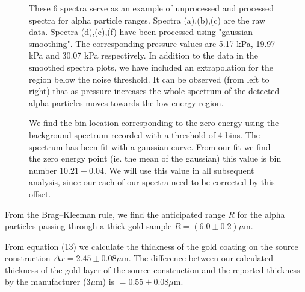 \documentclass[a4paper]{article}
\begin{document}
\begin{figure}[!htbp]
{{}}
\caption{These 6 spectra serve as an example of unprocessed and processed spectra for alpha particle ranges. Spectra (a),(b),(c) are the raw data. Spectra (d),(e),(f) have been processed using "gaussian smoothing". The corresponding pressure values are 5.17 kPa, 19.97 kPa and 30.07 kPa respectively. In addition to the data in the smoothed spectra plots, we have included an extrapolation for the region below the noise threshold. It can be observed (from left to right) that as pressure increases the whole spectrum of the detected alpha particles moves towards the low energy region.
}
\end{figure}
\clearpage
\begin{figure}
\caption{
 We find the bin location corresponding to the zero energy using the background spectrum recorded with a threshold of 4 bins. The spectrum has been fit with a gaussian curve. From our fit we find the zero energy point (ie. the mean of the gaussian) this value is bin number $10.21 \pm 0.04$. We will use this value in all subsequent analysis, since our each of our spectra need to be corrected by this offset.
 }
\end{figure}
\clearpage

From the Brag--Kleeman rule, we find the anticipated range $R$ for the alpha particles passing through a thick gold sample $R = (6.0 \pm 0.2)\mu$m.

From equation (13) we calculate the thickness of the gold coating on the source construction $\Delta x = 2.45 \pm 0.08\mu$m. The difference between our calculated thickness of the gold layer of the source construction and the reported thickness by the manufacturer\cite{SPA} ($3 \mu$m) is $ = 0.55 ± 0.08\mu$m.
\end{document}
